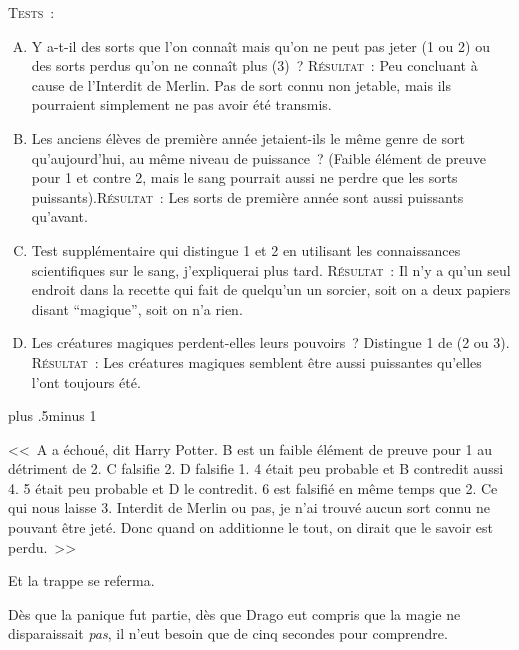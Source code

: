 \begin{centering}
\begin{samepage}
\scshape Tests~:
\itshape
        \begin{enumerate}[A.]{
                \firmlist
                \setlength{\leftmargin}{\parindent}
                \setlength{\rightmargin}{1cm}}
        \item Y a-t-il des sorts que l'on connaît mais qu'on ne peut pas jeter (1 ou 2) ou des sorts perdus qu'on ne connaît plus (3)~? {\scshape Résultat~:} Peu concluant à cause de l'Interdit de Merlin. Pas de sort connu non jetable, mais ils pourraient simplement ne pas avoir été transmis.
        \item Les anciens élèves de première année jetaient-ils le même genre de sort qu'aujourd'hui, au même niveau de puissance~? (Faible élément de preuve pour 1 et contre 2, mais le sang pourrait aussi ne perdre que les sorts puissants).{\scshape Résultat~:} Les sorts de première année sont aussi puissants qu'avant.
        \item Test supplémentaire qui distingue 1 et 2 en utilisant les connaissances scientifiques sur le sang, j'expliquerai plus tard. {\scshape Résultat~:} Il n'y a qu'un seul endroit dans la recette qui fait de quelqu'un un sorcier, soit on a deux papiers disant “magique”, soit on n'a rien.
        \item Les créatures magiques perdent-elles leurs pouvoirs~? Distingue 1 de (2 ou 3). {\scshape Résultat~:} Les créatures magiques semblent être aussi puissantes qu'elles l'ont toujours été.
        \end{enumerate}
\end{samepage}
\end{centering}

\baselineskip plus .5\textheight minus 1\baselineskip

\restoretrivseps

<<~A a échoué, dit Harry Potter. B est un faible élément de preuve pour 1 au détriment de 2. C falsifie 2. D falsifie 1. 4 était peu probable et B contredit aussi 4. 5 était peu probable et D le contredit. 6 est falsifié en même temps que 2. Ce qui nous laisse 3. Interdit de Merlin ou pas, je n'ai trouvé aucun sort connu ne pouvant être jeté. Donc quand on additionne le tout, on dirait que le savoir est perdu.~>>

Et la trappe se referma.

Dès que la panique fut partie, dès que Drago eut compris que la magie ne disparaissait \emph{pas}, il n'eut besoin que de cinq secondes pour comprendre.

